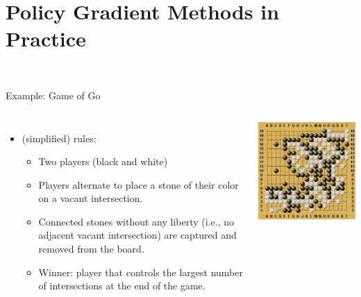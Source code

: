 \documentclass[11pt,table]{beamer}
\begin{document}
\section{Policy Gradient Methods in Practice}
{
\begin{frame}
\centering
\Huge
\textcolor{white}{Policy Gradient Methods in Practice}
\thispagestyle{empty}
\end{frame}
}

\begin{frame}{Example: Game of Go}


\begin{columns}[c]
    \begin{itemize}
        \item (simplified) rules:
        \begin{itemize}
            \item Two players (black and white)\\[2ex]
            \item Players alternate to place a stone of their color on a vacant intersection.\\[2ex]
            \item Connected stones without any liberty (i.e., no adjacent vacant intersection) are captured and removed from the board.\\[2ex]
            \item Winner: player that controls the largest number of intersections at the end of the game.
        \end{itemize}
    \end{itemize}

    \centering
    \includegraphics[width=\linewidth]{figures/1.jpg}
\end{columns}


\end{frame}
\end{document}
